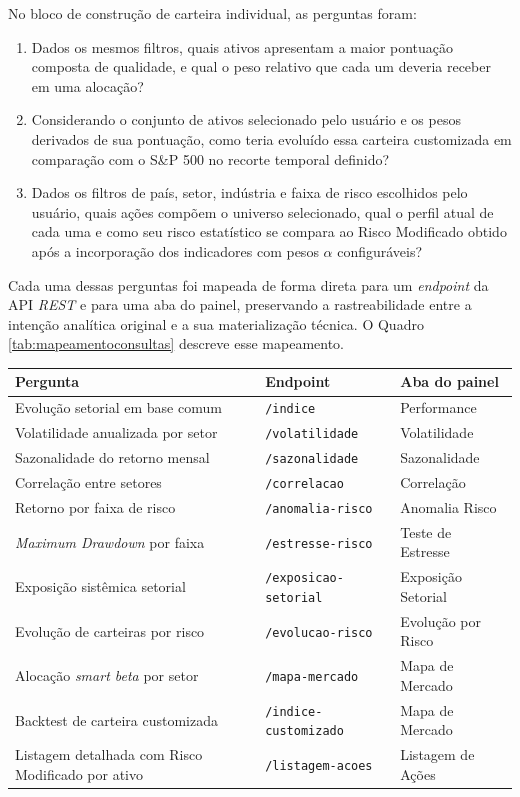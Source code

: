 No bloco de construção de carteira individual, as perguntas foram:

\begin{enumerate}
    \item Dados os mesmos filtros, quais ativos apresentam a maior pontuação composta de qualidade, e qual o peso relativo que cada um deveria receber em uma alocação?
    \item Considerando o conjunto de ativos selecionado pelo usuário e os pesos derivados de sua pontuação, como teria evoluído essa carteira customizada em comparação com o S\&P 500 no recorte temporal definido?
    \item Dados os filtros de país, setor, indústria e faixa de risco escolhidos pelo usuário, quais ações compõem o universo selecionado, qual o perfil atual de cada uma e como seu risco estatístico se compara ao Risco Modificado obtido após a incorporação dos indicadores com pesos $\alpha$ configuráveis?
\end{enumerate}

Cada uma dessas perguntas foi mapeada de forma direta para um \textit{endpoint} da API \textit{REST} e para uma aba do painel, preservando a rastreabilidade entre a intenção analítica original e a sua materialização técnica. O Quadro \ref{tab:mapeamentoconsultas} descreve esse mapeamento.

\begin{quadro}[h]
\centering
\caption{Mapeamento entre as perguntas em linguagem natural, os \textit{endpoints} da API e as abas do painel.}
\label{tab:mapeamentoconsultas}
\begin{tabular}{|p{5.5cm}|p{4cm}|p{4cm}|}
\hline
\textbf{Pergunta} & \textbf{Endpoint} & \textbf{Aba do painel} \\ \hline
Evolução setorial em base comum & \texttt{/indice} & Performance \\ \hline
Volatilidade anualizada por setor & \texttt{/volatilidade} & Volatilidade \\ \hline
Sazonalidade do retorno mensal & \texttt{/sazonalidade} & Sazonalidade \\ \hline
Correlação entre setores & \texttt{/correlacao} & Correlação \\ \hline
Retorno por faixa de risco & \texttt{/anomalia-risco} & Anomalia Risco \\ \hline
\textit{Maximum Drawdown} por faixa & \texttt{/estresse-risco} & Teste de Estresse \\ \hline
Exposição sistêmica setorial & \texttt{/exposicao-setorial} & Exposição Setorial \\ \hline
Evolução de carteiras por risco & \texttt{/evolucao-risco} & Evolução por Risco \\ \hline
Alocação \textit{smart beta} por setor & \texttt{/mapa-mercado} & Mapa de Mercado \\ \hline
Backtest de carteira customizada & \texttt{/indice-customizado} & Mapa de Mercado \\ \hline
Listagem detalhada com Risco Modificado por ativo & \texttt{/listagem-acoes} & Listagem de Ações \\ \hline
\end{tabular}
\end{quadro}

